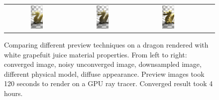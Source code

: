 \begin{figure}
\begin{tabular}{@{}c@{}c@{}c@{}c@{}c@{}}
\includegraphics[width=0.2\textwidth]{figures/thesis_pt_unconverged2}& 	 	 \includegraphics[width=0.2\textwidth]{figures/thesis_pt_sd}& 	 	 \includegraphics[width=0.2\textwidth]{figures/thesis_pt_lambertian} \\
\end{tabular}
\caption{Comparing different preview techniques on a dragon rendered with white grapefuit juice material properties. From left to right: converged image, noisy unconverged image, downsampled image, different physical model, diffuse appearance. Preview images took 120 seconds to render on a GPU ray tracer. Converged result took 4 hours.} 
\label{fig:comparison_convergence}
\end{figure}


